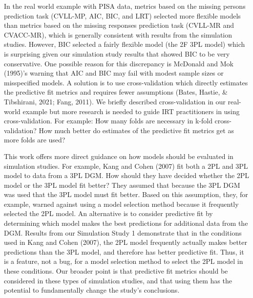 \documentclass[
  english,
  man,floatsintext]{apa7}
\begin{document}
In the real world example with PISA data, metrics based on the missing persons prediction task (CVLL-MP, AIC, BIC, and LRT) selected more flexible models than metrics based on the missing responses prediction task (CVLL-MR and CVACC-MR), which is generally consistent with results from the simulation studies. However, BIC selected a fairly flexible model (the 2F 3PL model) which is surprising given our simulation study results that showed BIC to be very conservative. One possible reason for this discrepancy is McDonald and Mok (1995)'s warning that AIC and BIC may fail with modest sample sizes or misspecified models. A solution is to use cross-validation which directly estimates the predictive fit metrics and requires fewer assumptions (Bates, Hastie, \& Tibshirani, 2021; Fang, 2011). We briefly described cross-validation in our real-world example but more research is needed to guide IRT practitioners in using cross-validation. For example: How many folds are necessary in k-fold cross-validation? How much better do estimates of the predictive fit metrics get as more folds are used?

This work offers more direct guidance on how models should be evaluated in simulation studies. For example, Kang and Cohen (2007) fit both a 2PL and 3PL model to data from a 3PL DGM. How should they have decided whether the 2PL model or the 3PL model fit better? They assumed that because the 3PL DGM was used that the 3PL model must fit better. Based on this assumption, they, for example, warned against using a model selection method because it frequently selected the 2PL model. An alternative is to consider predictive fit by determining which model makes the best predictions for additional data from the DGM. Results from our Simulation Study 1 demonstrate that in the conditions used in Kang and Cohen (2007), the 2PL model frequently actually makes better predictions than the 3PL model, and therefore has better predictive fit. Thus, it is a feature, not a bug, for a model selection method to select the 2PL model in these conditions. Our broader point is that predictive fit metrics should be considered in these types of simulation studies, and that using them has the potential to fundamentally change the study's conclusions.
\end{document}
